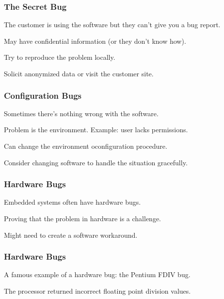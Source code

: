 \begin{frame}
\frametitle{The Secret Bug}
\begin{changemargin}{1cm}

The customer is using the software but they can't give you a bug report.

May have confidential information (or they don't know how).

Try to reproduce the problem locally.

Solicit anonymized data or visit the customer site.

\end{changemargin}
\end{frame}

\begin{frame}
\frametitle{Configuration Bugs}
\begin{changemargin}{1cm}

Sometimes there's nothing wrong with the software.

Problem is the environment. Example: user lacks permissions.

Can change the environment oconfiguration procedure.

Consider changing software to handle the situation gracefully.

\end{changemargin}
\end{frame}

\begin{frame}
\frametitle{Hardware Bugs}
\begin{changemargin}{1cm}

Embedded systems often have hardware bugs.

Proving that the problem in hardware is a challenge.

Might need to create a software workaround.

\end{changemargin}
\end{frame}

\begin{frame}
\frametitle{Hardware Bugs}
\begin{changemargin}{1cm}

A famous example of a hardware bug: the Pentium FDIV bug.

The processor returned incorrect floating point division values.

\end{changemargin}
\end{frame}


